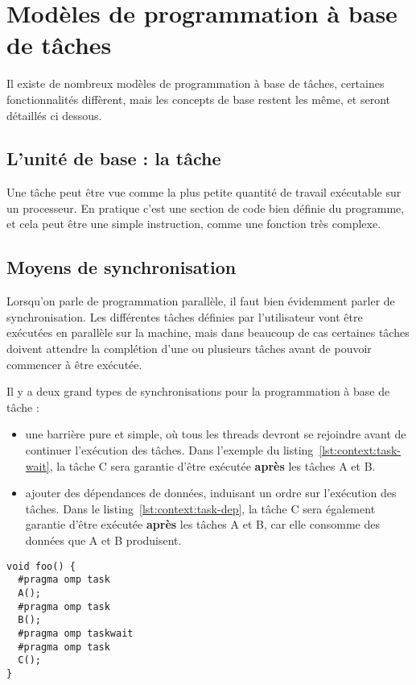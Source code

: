 \section{Modèles de programmation à base de tâches}\label{sec:context:others}

Il existe de nombreux modèles de programmation à base de tâches, certaines fonctionnalités diffèrent, mais les concepts de base restent les même, et seront détaillés ci dessous.

\subsection{L'unité de base : la tâche}

Une tâche peut être vue comme la plus petite quantité de travail exécutable sur un processeur.
En pratique c'est une section de code bien définie du programme, et cela peut être une simple instruction, comme une fonction très complexe.

\subsection{Moyens de synchronisation}

Lorsqu'on parle de programmation parallèle, il faut bien évidemment parler de synchronisation.
Les différentes tâches définies par l'utilisateur vont être exécutées en parallèle sur la machine, mais dans beaucoup de cas certaines tâches doivent attendre la complétion d'une ou plusieurs tâches avant de pouvoir commencer à être exécutée.

Il y a deux grand types de synchronisations pour la programmation à base de tâche :

\begin{itemize}
  \item une barrière pure et simple, où tous les threads devront se rejoindre avant de continuer l'exécution des tâches. Dans l'exemple du listing~\ref{lst:context:task-wait}, la tâche C sera garantie d'être exécutée \textbf{après} les tâches A et B.
  \item ajouter des dépendances de données, induisant un ordre sur l'exécution des tâches. Dans le listing~\ref{lst:context:task-dep}, la tâche C sera également garantie d'être exécutée \textbf{après} les tâches A et B, car elle consomme des données que A et B produisent.
\end{itemize}

\begin{lstlisting}[caption=Synchronisation via une barrière,label=lst:context:task-wait]
void foo() {
  #pragma omp task
  A();
  #pragma omp task
  B();
  #pragma omp taskwait
  #pragma omp task
  C();
}
\end{lstlisting}

